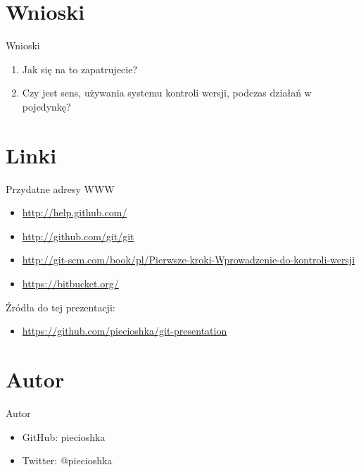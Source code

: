 \documentclass{beamer}
\begin{document}

\section{Wnioski}

\begin{frame}{Wnioski}
\begin{enumerate}
  \item Jak się na to zapatrujecie?
  \item Czy jest sens, używania systemu kontroli wersji, podczas działań w pojedynkę?
\end{enumerate}
\end{frame}


\section{Linki}

\begin{frame}{Przydatne adresy WWW}
\begin{itemize}
  \item \url{http://help.github.com/}
  \item \url{http://github.com/git/git}
  \item \url{http://git-scm.com/book/pl/Pierwsze-kroki-Wprowadzenie-do-kontroli-wersji}
  \item \url{https://bitbucket.org/}
\end{itemize}
\vskip 1cm
Źródła do tej prezentacji:
\begin{itemize}
  \item \url{https://github.com/piecioshka/git-presentation}

\end{itemize}
\end{frame}


\section{Autor}

\begin{frame}{Autor}
\begin{itemize}
  \item GitHub: piecioshka
  \item Twitter: @piecioshka
\end{itemize}
\end{frame}
\end{document}
